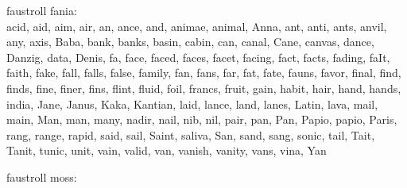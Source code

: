 {faustroll fania:\\
acid, aid, aim, air, an, ance, and, animae, animal, Anna, ant, anti, ants, anvil, any, axis, Baba, bank, banks, basin, cabin, can, canal, Cane, canvas, dance, Danzig, data, Denis, fa, face, faced, faces, facet, facing, fact, facts, fading, faIt, faith, fake, fall, falls, false, family, fan, fans, far, fat, fate, fauns, favor, final, find, finds, fine, finer, fins, flint, fluid, foil, francs, fruit, gain, habit, hair, hand, hands, india, Jane, Janus, Kaka, Kantian, laid, lance, land, lanes, Latin, lava, mail, main, Man, man, many, nadir, nail, nib, nil, pair, pan, Pan, Papio, papio, Paris, rang, range, rapid, said, sail, Saint, saliva, San, sand, sang, sonic, tail, Tait, Tanit, tunic, unit, vain, valid, van, vanish, vanity, vans, vina, Yan

faustroll moss:\\
}
